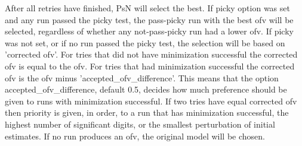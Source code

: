 After all retries have finished, PsN will select the best. If picky option was set and any run passed the picky test, the pass-picky run with the best ofv will be selected, regardless of whether any not-pass-picky run had a lower ofv. If picky was not set, or if no run passed the picky test, the selection will be based on 'corrected ofv'. For tries that did not have minimization successful the corrected ofv is equal to the ofv. For tries that had minimization successful the corrected ofv is the ofv minus 'accepted\_ofv\_difference'. This means that the option accepted\_ofv\_difference, default 0.5, decides how much preference should be given to runs with minimization successful. If two tries have equal corrected ofv then priority is given, in order, to a run that has minimization successful, the highest number of significant digits, or the smallest perturbation of initial estimates. If no run produces an ofv, the original model will be chosen.

